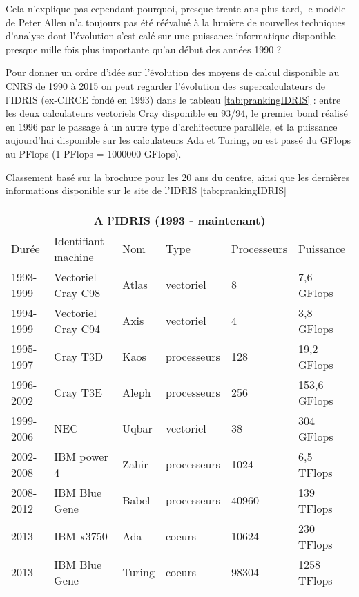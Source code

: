Cela n'explique pas cependant pourquoi, presque trente ans plus tard, le modèle de Peter Allen n'a toujours pas été réévalué à la lumière de nouvelles techniques d'analyse dont l'évolution s'est calé sur une puissance informatique disponible presque mille fois plus importante qu'au début des années 1990 ?

Pour donner un ordre d'idée sur l'évolution des moyens de calcul disponible au CNRS de 1990 à 2015 on peut regarder l'évolution des supercalculateurs de l'IDRIS (ex-CIRCE fondé en 1993) dans le tableau \ref{tab:prankingIDRIS} : entre les deux calculateurs vectoriels Cray disponible en 93/94, le premier bond réalisé en 1996 par le passage à un autre type d'architecture parallèle, et la puissance aujourd'hui disponible sur les calculateurs Ada et Turing, on est passé du GFlops au PFlops (1 PFlops = 1000000 GFlops).

\begin{table}[!htbp]
\begin{sidecaption}[fortoc]{Classement basé sur la brochure pour les 20 ans du centre, ainsi que les dernières informations disponible sur le site de l'IDRIS}
	[tab:prankingIDRIS]
	\centering
	\begin{tabular}{@{}llllll@{}}
\toprule
\multicolumn{6}{c}{A l'IDRIS (1993 - maintenant)} \\ \midrule
Durée & Identifiant machine & Nom & Type & Processeurs & Puissance \\ \midrule
1993-1999 & Vectoriel Cray C98 & Atlas & vectoriel & 8 & 7,6 GFlops \\
1994-1999 & Vectoriel Cray C94 & Axis & vectoriel & 4 & 3,8 GFlops \\
1995-1997 & Cray T3D & Kaos & processeurs & 128 & 19,2 GFlops \\
1996-2002 & Cray T3E & Aleph & processeurs & 256 & 153,6 GFlops \\
1999-2006 & NEC & Uqbar & vectoriel & 38 & 304 GFlops \\
2002-2008 & IBM power 4 & Zahir & processeurs & 1024 & 6,5 TFlops \\
2008-2012 & IBM Blue Gene & Babel & processeurs & 40960 & 139 TFlops \\
2013 & IBM x3750 & Ada & coeurs & 10624 & 230 TFlops \\
2013 & IBM Blue Gene & Turing & coeurs & 98304 & 1258 TFlops \\ \bottomrule
\end{tabular}
\end{sidecaption}
\end{table}

